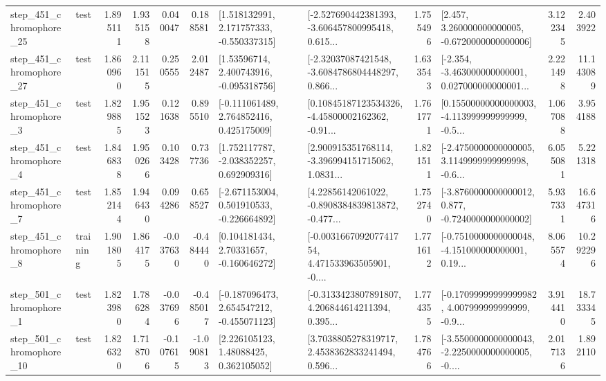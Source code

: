 \begin{tabular}{llrrrrllrlrr}
  step\_451\_chromophore\_25 &      test &      1.895111 &    1.935158 &      0.040047 &  0.188581 &    [1.518132991, 2.171757333, -0.550337315] &  [-2.527690442381393, -3.606457800995418, 0.615... &       1.755496 &    [2.457, 3.260000000000005, -0.6720000000000006] &            3.122345 &          2.403922 \\
  step\_451\_chromophore\_27 &      test &      1.860960 &    2.111515 &      0.250555 &  2.012487 &     [1.53596714, 2.400743916, -0.095318756] &  [-2.32037087421548, -3.6084786804448297, 0.866... &       1.633543 &  [-2.354, -3.463000000000001, 0.027000000000001... &            2.221498 &         11.143089 \\
   step\_451\_chromophore\_3 &      test &      1.829885 &    1.951523 &      0.121638 &  0.895510 &    [-0.111061489, 2.764852416, 0.425175009] &  [0.10845187123534326, -4.45800002162362, -0.91... &       1.761771 &  [0.15500000000000003, -4.113999999999999, -0.5... &            1.067088 &          3.954188 \\
   step\_451\_chromophore\_4 &      test &      1.846838 &    1.950266 &      0.103428 &  0.737736 &    [1.752117787, -2.038352257, 0.692909316] &  [2.900915351768114, -3.396994151715062, 1.0831... &       1.821511 &  [-2.4750000000000005, 3.1149999999999998, -0.6... &            6.055081 &          5.221318 \\
   step\_451\_chromophore\_7 &      test &      1.852144 &    1.946430 &      0.094286 &  0.658527 &   [-2.671153004, 0.501910533, -0.226664892] &  [4.22856142061022, -0.8908384839813872, -0.477... &       1.752740 &  [-3.8760000000000012, 0.877, -0.7240000000000002] &            5.937331 &         16.647316 \\
   step\_451\_chromophore\_8 &  training &      1.901805 &    1.864175 &     -0.037630 & -0.484440 &     [0.104181434, 2.70331657, -0.160646272] &  [-0.003166709207741754, 4.471533963505901, -0.... &       1.771612 &  [-0.7510000000000048, -4.151000000000001, 0.19... &            8.065574 &         10.292296 \\
   step\_501\_chromophore\_1 &      test &      1.823980 &    1.786284 &     -0.037696 & -0.485017 &   [-0.187096473, 2.654547212, -0.455071123] &  [-0.3133423807891807, 4.206844614211394, 0.395... &       1.774355 &  [-0.17099999999999982, 4.007999999999999, -0.9... &            3.914410 &         18.733345 \\
  step\_501\_chromophore\_10 &      test &      1.826320 &    1.718706 &     -0.107615 & -1.090813 &      [2.226105123, 1.48088425, 0.362105052] &  [3.7038805278319717, 2.4538362833241494, 0.596... &       1.784766 &  [-3.5500000000000043, -2.2250000000000005, -0.... &            2.017136 &          1.892110 \\

\end{tabular}
